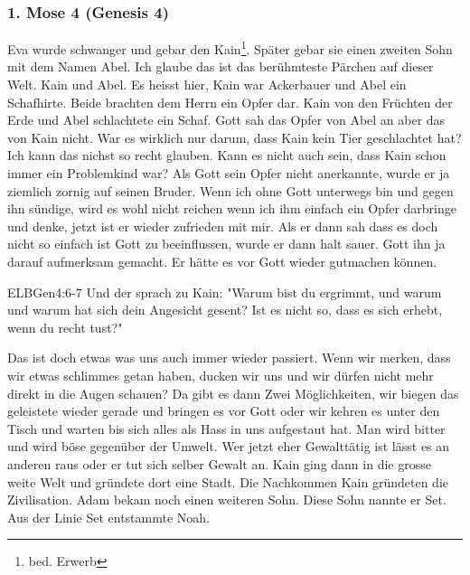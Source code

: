 
\subsubsection{1. Mose 4 (Genesis 4)}
Eva wurde schwanger und gebar den Kain\footnote{bed. Erwerb}. Später gebar sie einen zweiten Sohn mit dem Namen Abel. Ich glaube das ist das berühmteste Pärchen auf dieser Welt. Kain und Abel. Es heisst hier, Kain war Ackerbauer und Abel ein Schafhirte. Beide brachten dem Herrn ein Opfer dar. Kain von den Früchten der Erde und Abel schlachtete ein Schaf. Gott sah das Opfer von Abel an aber das von Kain nicht. War es wirklich nur darum, dass Kain kein Tier geschlachtet hat? Ich kann das nichst so recht glauben. Kann es nicht auch sein, dass Kain schon immer ein Problemkind war? Als Gott sein Opfer nicht anerkannte, wurde er ja ziemlich zornig auf seinen Bruder. Wenn ich ohne Gott unterwegs bin und gegen ihn sündige, wird es wohl nicht reichen wenn ich ihm einfach ein Opfer darbringe und denke, jetzt ist er wieder zufrieden mit mir. Als er dann sah dass es doch nicht so einfach ist Gott zu beeinflussen, wurde er dann halt sauer. Gott ihn ja darauf aufmerksam gemacht. Er hätte es vor Gott wieder gutmachen können.
\begin{bibeltext}{ELB}{Gen}{4:6-7}
	Und der \herr{} sprach zu Kain: "Warum bist du ergrimmt, und warum und warum hat sich dein Angesicht gesent? Ist es nicht so, dass es sich erhebt, wenn du recht tust?"
\end{bibeltext}
Das ist doch etwas was uns auch immer wieder passiert. Wenn wir merken, dass wir etwas schlimmes getan haben, ducken wir uns und wir dürfen nicht mehr direkt in die Augen schauen? Da gibt es dann Zwei Möglichkeiten, wir biegen das geleistete wieder gerade und bringen es vor Gott oder wir kehren es unter den Tisch und warten bis sich alles als Hass in uns aufgestaut hat. Man wird bitter und wird böse gegenüber der Umwelt. Wer jetzt eher Gewalttätig ist lässt es an anderen raus oder er tut sich selber Gewalt an. Kain ging dann in die grosse weite Welt und gründete dort eine Stadt. Die Nachkommen Kain gründeten die Zivilisation. Adam bekam noch einen weiteren Sohn. Diese Sohn nannte er Set. Aus der Linie Set entstammte Noah.
